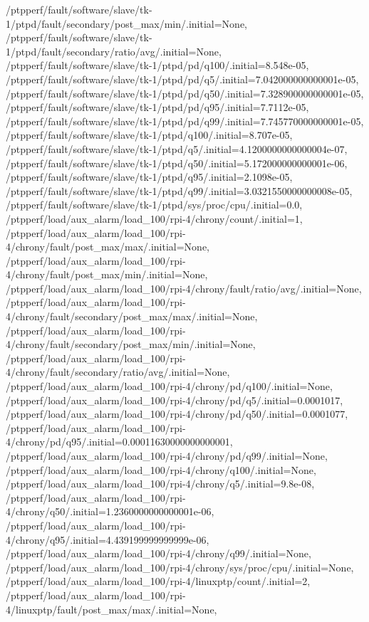 {    /ptpperf/fault/software/slave/tk-1/ptpd/fault/secondary/post_max/min/.initial=None,
    /ptpperf/fault/software/slave/tk-1/ptpd/fault/secondary/ratio/avg/.initial=None,
    /ptpperf/fault/software/slave/tk-1/ptpd/pd/q100/.initial=8.548e-05,
    /ptpperf/fault/software/slave/tk-1/ptpd/pd/q5/.initial=7.042000000000001e-05,
    /ptpperf/fault/software/slave/tk-1/ptpd/pd/q50/.initial=7.328900000000001e-05,
    /ptpperf/fault/software/slave/tk-1/ptpd/pd/q95/.initial=7.7112e-05,
    /ptpperf/fault/software/slave/tk-1/ptpd/pd/q99/.initial=7.745770000000001e-05,
    /ptpperf/fault/software/slave/tk-1/ptpd/q100/.initial=8.707e-05,
    /ptpperf/fault/software/slave/tk-1/ptpd/q5/.initial=4.1200000000000004e-07,
    /ptpperf/fault/software/slave/tk-1/ptpd/q50/.initial=5.172000000000001e-06,
    /ptpperf/fault/software/slave/tk-1/ptpd/q95/.initial=2.1098e-05,
    /ptpperf/fault/software/slave/tk-1/ptpd/q99/.initial=3.0321550000000008e-05,
    /ptpperf/fault/software/slave/tk-1/ptpd/sys/proc/cpu/.initial=0.0,
    /ptpperf/load/aux_alarm/load_100/rpi-4/chrony/count/.initial=1,
    /ptpperf/load/aux_alarm/load_100/rpi-4/chrony/fault/post_max/max/.initial=None,
    /ptpperf/load/aux_alarm/load_100/rpi-4/chrony/fault/post_max/min/.initial=None,
    /ptpperf/load/aux_alarm/load_100/rpi-4/chrony/fault/ratio/avg/.initial=None,
    /ptpperf/load/aux_alarm/load_100/rpi-4/chrony/fault/secondary/post_max/max/.initial=None,
    /ptpperf/load/aux_alarm/load_100/rpi-4/chrony/fault/secondary/post_max/min/.initial=None,
    /ptpperf/load/aux_alarm/load_100/rpi-4/chrony/fault/secondary/ratio/avg/.initial=None,
    /ptpperf/load/aux_alarm/load_100/rpi-4/chrony/pd/q100/.initial=None,
    /ptpperf/load/aux_alarm/load_100/rpi-4/chrony/pd/q5/.initial=0.0001017,
    /ptpperf/load/aux_alarm/load_100/rpi-4/chrony/pd/q50/.initial=0.0001077,
    /ptpperf/load/aux_alarm/load_100/rpi-4/chrony/pd/q95/.initial=0.00011630000000000001,
    /ptpperf/load/aux_alarm/load_100/rpi-4/chrony/pd/q99/.initial=None,
    /ptpperf/load/aux_alarm/load_100/rpi-4/chrony/q100/.initial=None,
    /ptpperf/load/aux_alarm/load_100/rpi-4/chrony/q5/.initial=9.8e-08,
    /ptpperf/load/aux_alarm/load_100/rpi-4/chrony/q50/.initial=1.2360000000000001e-06,
    /ptpperf/load/aux_alarm/load_100/rpi-4/chrony/q95/.initial=4.439199999999999e-06,
    /ptpperf/load/aux_alarm/load_100/rpi-4/chrony/q99/.initial=None,
    /ptpperf/load/aux_alarm/load_100/rpi-4/chrony/sys/proc/cpu/.initial=None,
    /ptpperf/load/aux_alarm/load_100/rpi-4/linuxptp/count/.initial=2,
    /ptpperf/load/aux_alarm/load_100/rpi-4/linuxptp/fault/post_max/max/.initial=None,
}
